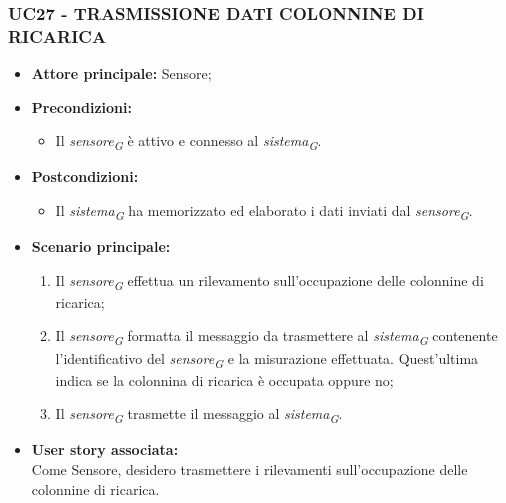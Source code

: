 \subsubsection{UC27 - TRASMISSIONE DATI COLONNINE DI RICARICA}
\begin{itemize}
    \item \textbf{Attore principale:} Sensore;
    \item \textbf{Precondizioni:}
        \begin{itemize}
            \item Il \textit{sensore}\textsubscript{\textit{G}} è attivo e connesso al \textit{sistema}\textsubscript{\textit{G}}. 
        \end{itemize}
    \item \textbf{Postcondizioni:}
        \begin{itemize}
            \item Il \textit{sistema}\textsubscript{\textit{G}} ha memorizzato ed elaborato i dati inviati dal \textit{sensore}\textsubscript{\textit{G}}.
        \end{itemize}
    \item \textbf{Scenario principale:}
        \begin{enumerate}
            \item Il \textit{sensore}\textsubscript{\textit{G}} effettua un rilevamento sull'occupazione delle colonnine di ricarica;
            \item Il \textit{sensore}\textsubscript{\textit{G}} formatta il messaggio da trasmettere al \textit{sistema}\textsubscript{\textit{G}} contenente l'identificativo del \textit{sensore}\textsubscript{\textit{G}} e la misurazione effettuata. Quest'ultima indica se la colonnina di ricarica è occupata oppure no;
            \item Il \textit{sensore}\textsubscript{\textit{G}} trasmette il messaggio al \textit{sistema}\textsubscript{\textit{G}}.
        \end{enumerate}
    \item \textbf{User story associata:} \\
    Come Sensore, desidero trasmettere i rilevamenti sull'occupazione delle colonnine di ricarica.
\end{itemize}